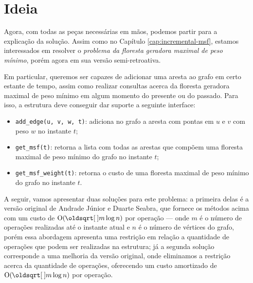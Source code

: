 \section{Ideia}
\label{sec:rmsf-ideia}


Agora, com todas as peças necessárias em mãos, podemos partir para a explicação da solução. Assim como no Capítulo \ref{cap:incremental-msf}, estamos interessados em resolver o \emph{problema da floresta geradora maximal de peso mínimo}, porém agora em sua versão semi-retroativa.

Em particular, queremos ser capazes de adicionar uma aresta ao grafo em certo estante de tempo, assim como realizar consultas acerca da floresta geradora maximal de peso mínimo em algum momento do presente ou do passado. Para isso, a estrutura deve conseguir dar suporte a seguinte interface:

\begin{itemize}
    \item \texttt{add\_edge(u, v, w, t)}: adiciona no grafo a aresta com pontas em $u$ e $v$ com peso $w$ no instante $t$;
    \item \texttt{get\_msf(t)}: retorna a lista com todas as arestas que compõem uma floresta maximal de peso mínimo do grafo no instante $t$;
    \item \texttt{get\_msf\_weight(t)}: retorna o custo de uma floresta maximal de peso mínimo do grafo no instante $t$.
\end{itemize}

A seguir, vamos apresentar duas soluções para este problema: a primeira delas é a versão original de Andrade Júnior e Duarte Seabra, que fornece os métodos acima com um custo de $\Oh(\sqrt{m} \log n)$ por operação --- onde $m$ é o número de operações realizadas até o instante atual e $n$ é o número de vértices do grafo, porém essa abordagem apresenta uma restrição em relação a quantidade de operações que podem ser realizadas na estrutura; já a segunda solução corresponde a uma melhoria da versão original, onde eliminamos a restrição acerca da quantidade de operações, oferecendo um custo amortizado de $\Oh(\sqrt{m} \log n)$ por operação.

